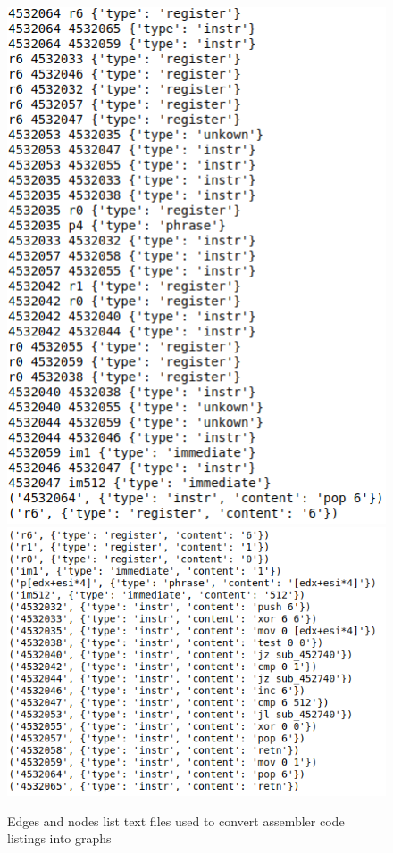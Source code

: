 \begin{appendices}
\begin{figure}[H]
%
  \centering
    \includegraphics[width=0.85\linewidth]{img/code_graph03.png}
\endminipage
{}%
  \centering
    \includegraphics[width=0.95\linewidth]{img/code_graph04.png}
\endminipage
\caption{Edges and nodes list text files used to convert assembler code listings into graphs}\label{fig:code_graph02}
\end{figure}







\end{appendices}
